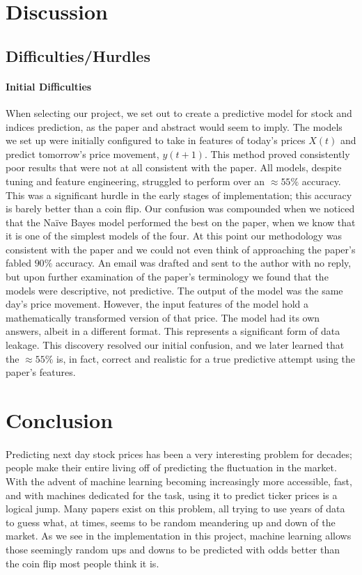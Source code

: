 \documentclass[11pt]{article}
\begin{document}
	\section{Discussion}
	
		\subsection{Difficulties/Hurdles}
		
		\paragraph{Initial Difficulties} When selecting our project, we set out to create a predictive model for stock and indices prediction, as the paper and abstract would seem to imply. The models we set up were initially configured to take in features of today's prices $X(t)$ and predict tomorrow's price movement, $y(t+1)$. This method proved consistently poor results that were not at all consistent with the paper. All models, despite tuning and feature engineering, struggled to perform over an $\approx55\%$ accuracy. This was a significant hurdle in the early stages of implementation; this accuracy is barely better than a coin flip. Our confusion was compounded when we noticed that the Naïve Bayes model performed the best on the paper, when we know that it is one of the simplest models of the four. At this point our methodology was consistent with the paper and we could not even think of approaching the paper's fabled $90\%$ accuracy. An email was drafted and sent to the author with no reply, but upon further examination of the paper's terminology we found that the models were descriptive, not predictive. The output of the model was the same day's price movement. However, the input features of the model hold a mathematically transformed version of that price. The model had its own answers, albeit in a different format. This represents a significant form of data leakage. This discovery resolved our initial confusion, and we later learned that the $\approx55\%$ is, in fact, correct and realistic for a true predictive attempt using the paper's features. 
	
	\section{Conclusion}
	
		\paragraph{} Predicting next day stock prices has been a very interesting problem for decades; people make their entire living off of predicting the fluctuation in the market. With the advent of machine learning becoming increasingly more accessible, fast, and with machines dedicated for the task, using it to predict ticker prices is a logical jump. Many papers exist on this problem, all trying to use years of data to guess what, at times, seems to be random meandering up and down of the market. As we see in the implementation in this project, machine learning allows those seemingly random ups and downs to be predicted with odds better than the coin flip most people think it is.
	
\end{document}
